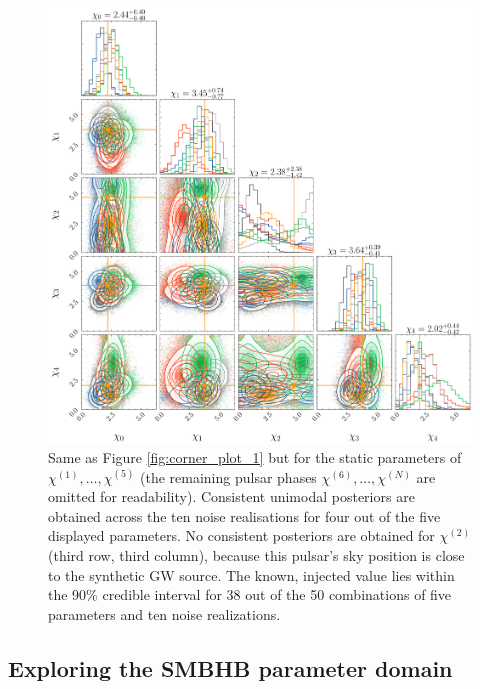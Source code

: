 \documentclass[fleqn,usenatbib,useAMS]{mnras}
\begin{document}
	\begin{figure}
	\includegraphics[width=\columnwidth, height =\columnwidth ]{images/corner_lowSNR_chi_n4000}
	\caption{Same as Figure \ref{fig:corner_plot_1}	but for the static parameters of $\chi^{(1)}, \dots, \chi^{(5)}$ (the remaining pulsar phases $\chi^{(6)}, \dots, \chi^{(N)}$ are omitted for readability). Consistent unimodal posteriors are obtained across the ten noise realisations for four out of the five displayed parameters. No consistent posteriors are obtained for $\chi^{(2)}$ (third row, third column), because this pulsar's sky position is close to the synthetic GW source. The known, injected value lies within the 90\% credible interval for 38 out of the 50 combinations of five parameters and ten noise realizations.}
	\label{fig:corner_plot_3}
\end{figure}



\subsection{Exploring the SMBHB parameter domain} \label{sec:parameter_space} 
\end{document}
